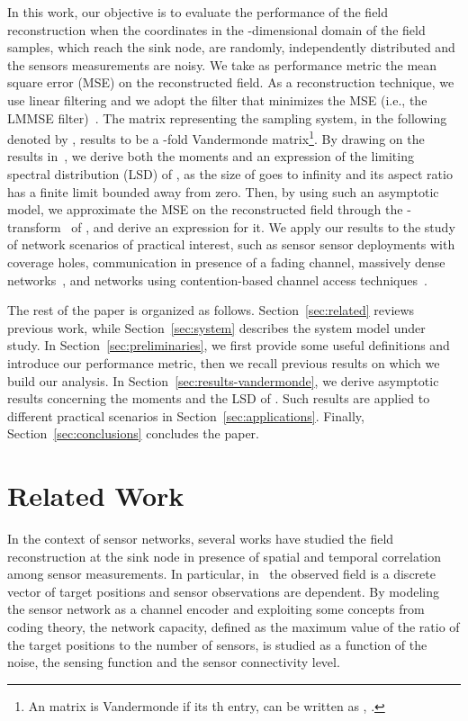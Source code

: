 \documentclass[11pt, draftcls, onecolumn, a4paper]{IEEEtran}
\begin{document}
In this work, our objective is to evaluate the performance of the
field reconstruction when the coordinates in the -dimensional
domain of the field samples, which reach the sink node, are randomly,
independently distributed and the sensors measurements are noisy.  We
take as performance metric the mean square error (MSE) on the
reconstructed field. As a reconstruction technique, we use linear
filtering and we adopt the filter that minimizes the MSE (i.e., the
LMMSE filter)~\cite{TSP1,TSP2,TSP3}.
The matrix representing the sampling system, in the following denoted
by , results to be a -fold Vandermonde matrix\footnote{An  matrix  is Vandermonde if its th entry,
   can be written as , .}.  By drawing on the results
in~\cite{TSP2,RyanDebbah}, we derive both the moments and an
expression of the limiting spectral distribution (LSD) of
, as the size of  goes to infinity and its aspect
ratio has a finite limit bounded away from zero.  Then, by using such
an asymptotic model, we approximate the MSE on the reconstructed field
through the -transform~\cite{tutorial} of , and
derive an expression for it.
We apply our results to the study of network scenarios of practical
interest, such as sensor sensor deployments with coverage holes,
communication in presence of a fading channel, massively dense networks~\cite{massdense1, massdense2}, 
and networks using contention-based channel access
techniques~\cite{802.15.4}.


The rest of the paper is organized as follows.
Section~\ref{sec:related} reviews previous work, while  
Section~\ref{sec:system} describes the system model
under study.
In Section~\ref{sec:preliminaries}, we first provide some useful definitions
and introduce our performance
metric, then  we recall previous results on which we build our
analysis.  
In Section~\ref{sec:results-vandermonde}, we derive asymptotic results
concerning the moments and the LSD of . Such results are applied to
different practical scenarios in Section~\ref{sec:applications}.
Finally, Section~\ref{sec:conclusions} concludes the paper.


\section{Related Work\label{sec:related}}
In the context of sensor networks, several works \cite{CristescuVetterli,Poor,Vuran04,Rachlin1} have studied the field reconstruction at the
sink node in presence of spatial and temporal correlation among 
sensor measurements.  In
particular, in~\cite{Rachlin1} the observed field is a discrete vector
of target positions and sensor observations are dependent. By modeling
the sensor network as a channel encoder and exploiting some concepts
from coding theory, the network capacity, defined as the maximum value of the
ratio of the target positions to the number of sensors, 
is studied as a function of
the noise, the sensing function and the sensor connectivity level.
 
\end{document}
